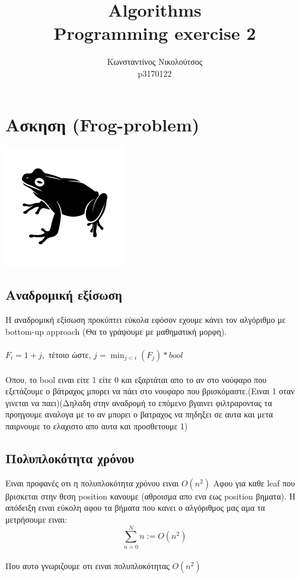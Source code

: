 \documentclass[12pt]{article}
\title{Algorithms \\ Programming exercise 2}
\author{Κωνσταντίνος Νικολούτσος \\ p3170122}
\date{}
\begin{document}
\maketitle


\section{Ασκηση (Frog-problem)}

\begin{center}
\includegraphics[scale=0.60]{black_frog.png}
\end{center}


\subsection{Αναδρομική εξίσωση}
Η αναδρομική εξίσωση προκύπτει εύκολα εφόσον εχουμε κάνει τον αλγόριθμο με bottom-up approach (Θα το γράψουμε με μαθηματική μορφη). \\\\
$F_i = 1 + j, $ τέτοιο ώστε,  $j = \min_{j < i} (F_j)*bool $ \\\\
Οπου, το bool ειναι είτε 1 είτε 0 και εξαρτάται απο το αν στο νούφαρο που εξετάζουμε ο βάτραχος μπορει να πάει στο νουφαρο που βρισκόμαστε.(Ειναι 1 οταν γινεται να παει)(Δηλαδη στην αναδρομή το επόμενο βγαινει φιλτραροντας τα προηγουμε αναλογα με το αν μπορει ο βατραχος να πηδηξει σε αυτα και μετα παιρνουμε το ελαχιστο απο αυτα και προσθετουμε 1) 


\subsection{Πολυπλοκότητα χρόνου}
Ειναι προφανές οτι η πολυπλοκότητα χρόνου ειναι $Ο(n^2)$
Αφου για καθε leaf που βρισκεται στην θεση position κανουμε (αθροισμα απο ενα εως position βηματα).
Η απόδειξη ειναι εύκολη αφου τα βήματα που κανει ο αλγόριθμος μας αμα τα μετρήσουμε ειναι:\\
$$\sum_{n=0}^{N} n := O(n^2)$$\\
Που αυτο γνωριζουμε οτι ειναι πολυπλοκότητας $O(n^2)$\\
\end{document}

